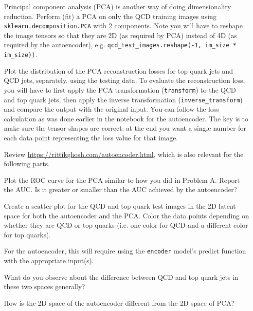 \begin{problem}[25]
Principal component analysis (PCA) is another way of doing dimensionality reduction.
Perform (fit) a PCA on only the QCD training images using \texttt{sklearn.decomposition.PCA} with 2 components.
Note you will have to reshape the image tensors so that they are 2D (as required by PCA) instead of 4D (as required by the autoencoder), e.g. \texttt{qcd_test_images.reshape(-1, im_size * im_size))}.

Plot the distribution of the PCA reconstruction losses for top quark jets and QCD jets, separately, using the testing data.
To evaluate the reconstruction loss, you will have to first apply the PCA transformation (\texttt{transform}) to the QCD and top quark jets, then apply the inverse transformation (\texttt{inverse_transform}) and compare the output with the original input.
You can follow the loss calculation as was done earlier in the notebook for the autoencoder.
The key is to make sure the tensor shapes are correct: at the end you want a single number for each data point representing the loss value for that image.

\begin{hint}
	Review \url{https://rittikghosh.com/autoencoder.html}, which is also relevant for the following parts.
\end{hint}
\end{problem}

\begin{problem}[15]
Plot the ROC curve for the PCA similar to how you did in Problem A.
Report the AUC.
Is it greater or smaller than the AUC achieved by the autoencoder?

\end{problem}

\begin{problem}[25]
Create a scatter plot for the QCD and top quark test images in the 2D latent space for both the autoencoder and the PCA.
Color the data points depending on whether they are QCD or top quarks (i.e. one color for QCD and a different color for top quarks).

For the autoencoder, this will require using the \texttt{encoder} model's {predict} function with the appropriate input(s).

What do you observe about the difference between QCD and top quark jets in these two spaces generally?

How is the 2D space of the autoencoder different from the 2D space of PCA?
\end{problem}


